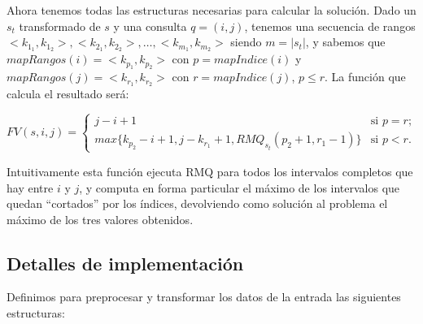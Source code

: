 Ahora tenemos todas las estructuras necesarias para calcular la solución. Dado
un $s_t$ transformado de $s$ y una consulta $q = (i, j)$, tenemos una
secuencia de rangos $<k_{1_1}, k_{1_2}>, <k_{2_1}, k_{2_2}>, \ldots, <k_{m_1}, k_{m_2}>$
siendo $m = |s_t|$, y sabemos que $mapRangos(i) = <k_{p_1}, k_{p_2}>$ con
$p = mapIndice(i)$ y $mapRangos(j) = <k_{r_1}, k_{r_2}>$ con $r = mapIndice(j)$, $p \le r$.
La función que calcula el resultado será:

\[ FV(s, i, j) = \left\{ \begin{array}{ll}
                 j - i + 1 & \mbox{si $p = r$};\\
                 max\{ k_{p_2} - i + 1, j - k_{r_1} + 1, RMQ_{s_t}(p_2 + 1, r_1 - 1) \} & \mbox{si $p < r$}.\end{array} \right. \]
     
Intuitivamente esta función ejecuta RMQ para todos los intervalos completos
que hay entre $i$ y $j$, y computa en forma particular el máximo de los
intervalos que quedan ``cortados'' por los índices, devolviendo como solución al
problema el máximo de los tres valores obtenidos.


\subsection*{Detalles de implementación}

Definimos para preprocesar y transformar los datos de la entrada las siguientes estructuras:

